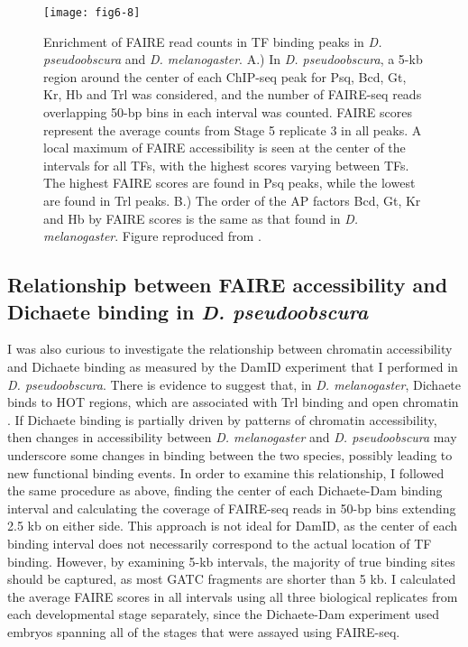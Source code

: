 \begin{figure}
\centering
\texttt{[image: fig6-8]}
\caption[Enrichment of FAIRE read counts in TF binding peaks in \emph{D. pseudoobscura} and \emph{D. melanogaster}]{Enrichment of FAIRE read counts in TF binding peaks in \emph{D. pseudoobscura} and \emph{D. melanogaster}. A.) In \emph{D. pseudoobscura}, a 5-kb region around the center of each ChIP-seq peak for Psq, Bcd, Gt, Kr, Hb and Trl was considered, and the number of FAIRE-seq reads overlapping 50-bp bins in each interval was counted. FAIRE scores represent the average counts from Stage 5 replicate 3 in all peaks. A local maximum of FAIRE accessibility is seen at the center of the intervals for all TFs, with the highest scores varying between TFs. The highest FAIRE scores are found in Psq peaks, while the lowest are found in Trl peaks. B.) The order of the AP factors Bcd, Gt, Kr and Hb by FAIRE scores is the same as that found in \emph{D. melanogaster}. Figure reproduced from \citet{mckay_common_2013}.}
\label{Figure 6.8}
\end{figure}

\subsection{Relationship between FAIRE accessibility and Dichaete binding in \emph{D. pseudoobscura}}
I was also curious to investigate the relationship between chromatin accessibility and Dichaete binding as measured by the DamID experiment that I performed in \emph{D. pseudoobscura}. There is evidence to suggest that, in \emph{D. melanogaster}, Dichaete binds to HOT regions, which are associated with Trl binding and open chromatin \citep{aleksic_role_2013,kvon_hot_2012}. If Dichaete binding is partially driven by patterns of chromatin accessibility, then changes in accessibility between \emph{D. melanogaster} and \emph{D. pseudoobscura} may underscore some changes in binding between the two species, possibly leading to new functional binding events. In order to examine this relationship, I followed the same procedure as above, finding the center of each Dichaete-Dam binding interval and calculating the coverage of FAIRE-seq reads in 50-bp bins extending 2.5 kb on either side. This approach is not ideal for DamID, as the center of each binding interval does not necessarily correspond to the actual location of TF binding. However, by examining 5-kb intervals, the majority of true binding sites should be captured, as most GATC fragments are shorter than 5 kb. I calculated the average FAIRE scores in all intervals using all three biological replicates from each developmental stage separately, since the Dichaete-Dam experiment used embryos spanning all of the stages that were assayed using FAIRE-seq.

